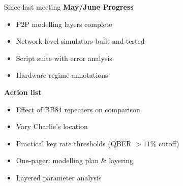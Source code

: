 \documentclass[10pt]{beamer}
\begin{document}
\begin{frame}{Since last meeting}
    \textbf{May/June Progress}
    \begin{itemize}\small
        \item P2P modelling layers complete
        \item Network-level simulators built and tested
        \item Script suite with error analysis
        \item Hardware regime annotations
    \end{itemize}
    \vspace{0.2cm}
    \textbf{Action list}
    \begin{itemize}\small
        \item Effect of BB84 repeaters on comparison \hfill{}
        \item Vary Charlie's location \hfill{}
        \item Practical key rate thresholds (QBER $> 11\%$ cutoff) \hfill{}
        \item One-pager: modelling plan \& layering \hfill{}
        \item Layered parameter analysis \hfill{} 
    \end{itemize}
\end{frame}
 
\end{document}
